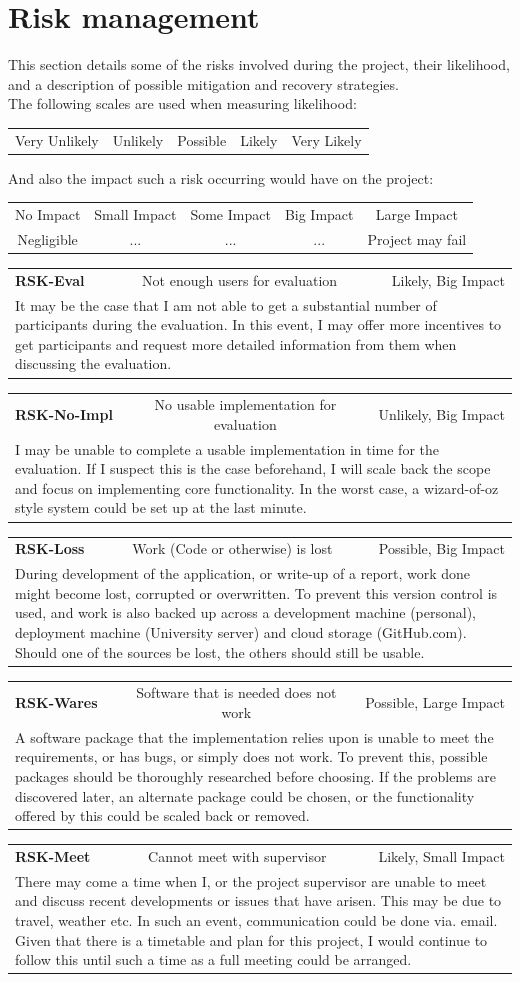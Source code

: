 \documentclass[a4paper,11pt]{report}
\newcommand{\riskitem}[4]{\begin{tabularx}{\textwidth}{lcr} \textbf{RSK-#1} & #2 & #3 \\  \multicolumn{3}{X}{#4} \\  \end{tabularx}}
\begin{document}
\section{Risk management}
This section details some of the risks involved during the project, their likelihood, and a description of possible mitigation and recovery strategies.\\
The following scales are used when measuring likelihood:\par
{\centering
\begin{tabular}{c|c|c|c|c}
Very Unlikely & Unlikely & Possible & Likely & Very Likely
\end{tabular}\par\noindent}
And also the impact such a risk occurring would have on the project:\par
{\centering
\begin{tabular}{c|c|c|c|c}
 No Impact & Small Impact & Some Impact & Big Impact & Large Impact\\
 Negligible & ... & ... & ... & Project may fail
\end{tabular}\par\noindent}
\riskitem{Eval}{Not enough users for evaluation}{Likely, Big Impact}{It may be the case that I am not able to get a substantial number of participants during the evaluation. In this event, I may offer more incentives to get participants and request more detailed information from them when discussing the evaluation.}
\riskitem{No-Impl}{No usable implementation for evaluation}{Unlikely, Big Impact}{I may be unable to complete a usable implementation in time for the evaluation. If I suspect this is the case beforehand, I will scale back the scope and focus on implementing core functionality. In the worst case, a wizard-of-oz style system could be set up at the last minute.}
\riskitem{Loss}{Work (Code or otherwise) is lost}{Possible, Big Impact}{During development of the application, or write-up of a report, work done might become lost, corrupted or overwritten. To prevent this version control is used, and work is also backed up across a development machine (personal), deployment machine (University server) and cloud storage (GitHub.com). Should one of the sources be lost, the others should still be usable.}
\riskitem{Wares}{Software that is needed does not work}{Possible, Large Impact}{A software package that the implementation relies upon is unable to meet the requirements, or has bugs, or simply does not work. To prevent this, possible packages should be thoroughly researched before choosing. If the problems are discovered later, an alternate package could be chosen, or the functionality offered by this could be scaled back or removed.}
\riskitem{Meet}{Cannot meet with supervisor}{Likely, Small Impact}{There may come a time when I, or the project supervisor are unable to meet and discuss recent developments or issues that have arisen. This may be due to travel, weather etc. In such an event, communication could be done via. email. Given that there is a timetable and plan for this project, I would continue to follow this until such a time as a full meeting could be arranged.}
\end{document}
